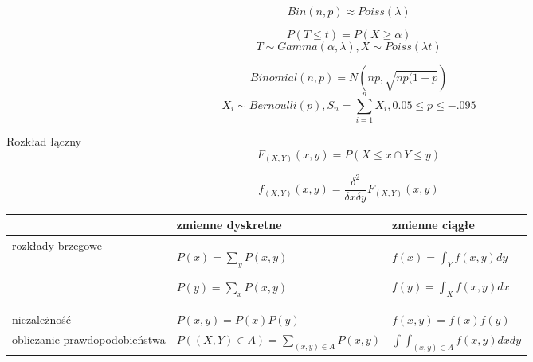 \documentclass[a4paper]{article}
\begin{document}
    \begin{equation}
        Bin(n, p) \approx Poiss(\lambda)
    \end{equation}

    \begin{equation}
        P(T \leq t) = P( X \geq \alpha)
    \end{equation}
    \begin{equation*}
        T \sim Gamma(\alpha, \lambda), X \sim Poiss(\lambda t)
    \end{equation*}

    \begin{equation}
        Binomial(n, p) = N(np, \sqrt{np(1-p})
    \end{equation}
    \begin{equation*}
        X_i \sim Bernoulli(p), S_n = \sum_{i=1}^{n} X_i, 0.05 \leq p \leq -.095
    \end{equation*}


    Rozkład łączny
    \begin{equation*}
        F_{(X,Y)}(x,y) = P( X \leq x \cap Y \leq y)
    \end{equation*}

    \begin{equation*}
        f_{(X,Y)}(x,y) = \frac{\delta^2}{\delta x \delta y} F_{(X,Y)}(x,y)
    \end{equation*}

    \begin{table}[H]
        \begin{center}
            \begin{tabular}{ p{5cm} | p{5.5cm} p{5cm} }
                & zmienne dyskretne & zmienne ciągłe\\
                \toprule
                rozkłady brzegowe &
                $P(x) = \sum_y P(x,y)$

                $P(y) = \sum_x P(x,y)$

                &
                $f(x) = \int_{Y} f(x,y)dy$

                $f(y) = \int_{X} f(x,y)dx$
                \\

                niezależność &
                $P(x,y) = P(x)P(y)$ &
                $f(x,y) = f(x)f(y)$
                \\

                obliczanie prawdopodobieństwa &
                $P( (X,Y) \in A) = \sum_{(x,y) \in A} P(x,y)$ &
                $\int \int_{(x,y) \in A} f(x,y)dx dy$\\

                \bottomrule
            \end{tabular}
        \end{center}
    \end{table}
\end{document}
